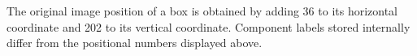 The original image position of a box is obtained by adding 36 to its horizontal coordinate and 202 to its vertical coordinate. Component labels stored internally differ from the positional numbers displayed above.
